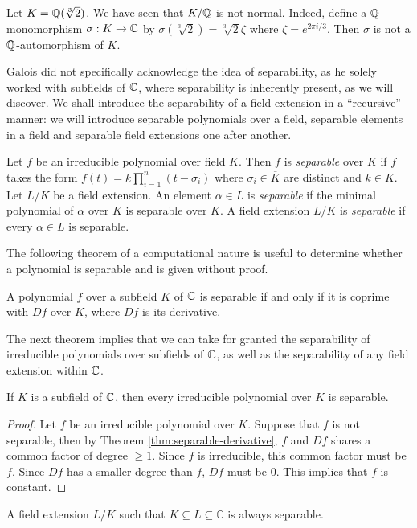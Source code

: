 \begin{example}
	Let $K = \mathbb Q(\sqrt[3]{2})$. We have seen that $K / \mathbb Q$ is not normal. Indeed, define a $\mathbb Q$-monomorphism $\sigma : K \to \mathbb C$ by $\sigma(\sqrt[3]{2}) =  \sqrt[3]{2}\zeta $ where $\zeta = e^{2 \pi i / 3}$. Then $\sigma$ is not a $\mathbb Q$-automorphism of $K$. 
\end{example}



Galois did not specifically acknowledge the idea of separability, as he solely worked with subfields of $\mathbb C$, where separability is inherently present, as we will discover. We shall introduce the separability of a field extension in a ``recursive'' manner: we will introduce separable polynomials over a field, separable elements in a field and separable field extensions one after another. 

\begin{definition}
    Let $f$ be an irreducible polynomial over field $K$. Then $f$ is \textit{separable} over $K$ if $f$ takes the form 
    $
        f(t) = k \prod_{i = 1} ^ n(t - \sigma_i)
    $
    where $\sigma_i \in \overline K$ are distinct and $k \in K$.
    Let $L/K$ be a field extension. An element $\alpha \in L$ is \textit{separable} if the minimal polynomial of $\alpha$ over $K$ is separable over $K$.
    A field extension $L / K$ is \textit{separable} if every $\alpha \in L$ is separable.
\end{definition}

The following theorem of a computational nature is useful to determine whether a polynomial is separable and is given without proof. 

\begin{theorem} \label{thm:separable-derivative}
    A polynomial $f$ over a subfield $K$ of  $\mathbb C$ is separable if and only if it is coprime with $Df$ over $K$, where $Df$ is its derivative. 
\end{theorem}

The next theorem implies that we can take for granted the separability of irreducible polynomials over subfields of $\mathbb C$, as well as the separability of any field extension within $\mathbb C$.


\begin{theorem} \label{thm:separable-poly-in-C}
    If $K$ is a subfield of $\mathbb C$, then every irreducible polynomial over $K$ is separable. 
\end{theorem}

\begin{proof}
    Let $f$ be an irreducible polynomial over $K$. Suppose that $f$ is not separable, then by Theorem \ref{thm:separable-derivative}, $f$ and $Df$ shares a common factor of degree $\ge 1$. Since $f$ is irreducible, this common factor must be $f$. Since $Df$ has a smaller degree than $f$, $Df$ must be $0$. This implies that $f$ is constant.
\end{proof}


\begin{corollary} \label{thm:separable-extension-in-C}
    A field extension $L/K$ such that $K \subseteq L \subseteq \mathbb C$ is always separable. 
\end{corollary}


